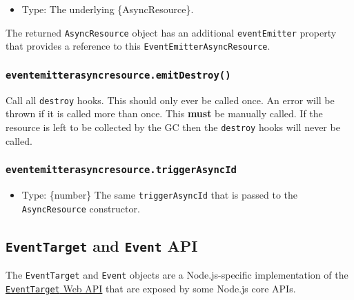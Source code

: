 \begin{itemize}
\tightlist
\item
  Type: The underlying \{AsyncResource\}.
\end{itemize}

The returned \texttt{AsyncResource} object has an additional
\texttt{eventEmitter} property that provides a reference to this
\texttt{EventEmitterAsyncResource}.

\subsubsection{\texorpdfstring{\texttt{eventemitterasyncresource.emitDestroy()}}{eventemitterasyncresource.emitDestroy()}}\label{eventemitterasyncresource.emitdestroy}

Call all \texttt{destroy} hooks. This should only ever be called once.
An error will be thrown if it is called more than once. This
\textbf{must} be manually called. If the resource is left to be
collected by the GC then the \texttt{destroy} hooks will never be
called.

\subsubsection{\texorpdfstring{\texttt{eventemitterasyncresource.triggerAsyncId}}{eventemitterasyncresource.triggerAsyncId}}\label{eventemitterasyncresource.triggerasyncid}

\begin{itemize}
\tightlist
\item
  Type: \{number\} The same \texttt{triggerAsyncId} that is passed to
  the \texttt{AsyncResource} constructor.
\end{itemize}

\subsection{\texorpdfstring{\texttt{EventTarget} and \texttt{Event}
API}{EventTarget and Event API}}\label{eventtarget-and-event-api}

The \texttt{EventTarget} and \texttt{Event} objects are a
Node.js-specific implementation of the
\href{https://dom.spec.whatwg.org/\#eventtarget}{\texttt{EventTarget}
Web API} that are exposed by some Node.js core APIs.

\begin{Shaded}
\begin{Highlighting}[]
\OperatorTok{=}  \NormalTok{()}\OperatorTok{;}

\NormalTok{(}\OperatorTok{,}\NormalTok{ (}\NormalTok{) }\KeywordTok{=\textgreater{}}\NormalTok{ \{}
  \NormalTok{(}\NormalTok{)}\OperatorTok{;}
\NormalTok{\})}\OperatorTok{;}
\end{Highlighting}
\end{Shaded}

